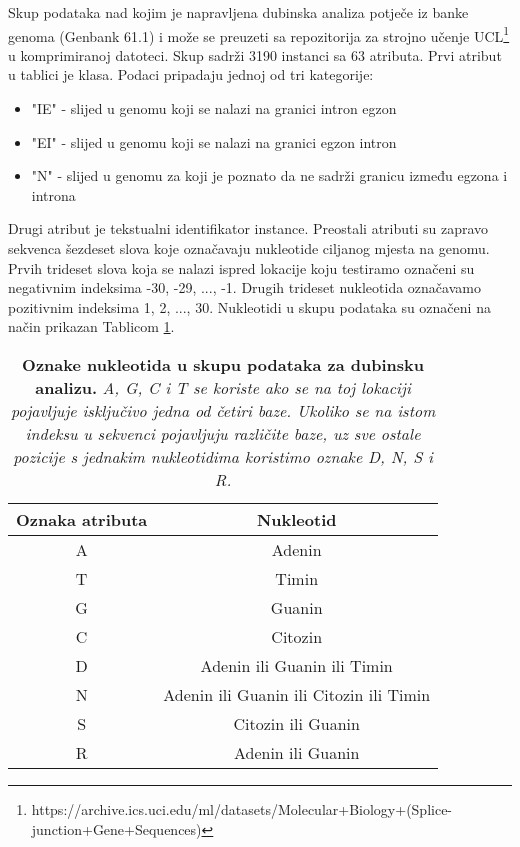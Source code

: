 Skup podataka nad kojim je napravljena dubinska analiza potječe iz banke genoma
(Genbank 61.1) i može se preuzeti sa repozitorija za strojno učenje UCL\footnote
{https://archive.ics.uci.edu/ml/datasets/Molecular+Biology+(Splice-junction+Gene+Sequences)}
u komprimiranoj datoteci. Skup sadrži 3190 instanci sa 63 atributa.
Prvi atribut u tablici je klasa. Podaci pripadaju jednoj od tri kategorije:
\begin{itemize}
   \item "IE" - slijed u genomu koji se nalazi na granici intron egzon
   \item "EI" - slijed u genomu koji se nalazi na granici egzon intron
   \item "N" - slijed u genomu za koji je poznato da ne sadrži granicu između egzona i introna
\end{itemize}
Drugi atribut je tekstualni identifikator instance.
Preostali atributi su zapravo sekvenca šezdeset slova koje označavaju nukleotide
ciljanog mjesta na genomu. Prvih trideset slova koja se nalazi ispred lokacije koju testiramo
označeni su negativnim indeksima {-30, -29, ..., -1}. Drugih trideset nukleotida označavamo
pozitivnim indeksima {1, 2, ..., 30}.
Nukleotidi u skupu podataka su označeni na način prikazan Tablicom \ref{tab:oznake}.

\begin{table}[!ht]
   \caption[Oznake nukleotida u skupu podataka za dubinsku analizu]{
   \textbf{Oznake nukleotida u skupu podataka za dubinsku analizu.} \textit{A, G, C i T se koriste ako se na
   toj lokaciji pojavljuje isključivo jedna od četiri baze. Ukoliko se na istom indeksu u sekvenci
   pojavljuju različite baze, uz sve ostale pozicije s jednakim nukleotidima koristimo oznake D, N, S i R.}}
   \centering
   \begin{tabular}{||c | c ||}
   \hline
   Oznaka atributa & Nukleotid \\ [0.5ex]
   \hline\hline
   A & Adenin \\
   T & Timin \\ 
   G & Guanin \\ 
   C & Citozin \\
   D & Adenin ili Guanin ili Timin \\
   N & Adenin ili Guanin ili Citozin ili Timin \\
   S & Citozin ili Guanin \\
   R & Adenin ili Guanin \\ [1ex]
   \hline
   \end{tabular}
   \label{tab:oznake}
\end{table}
